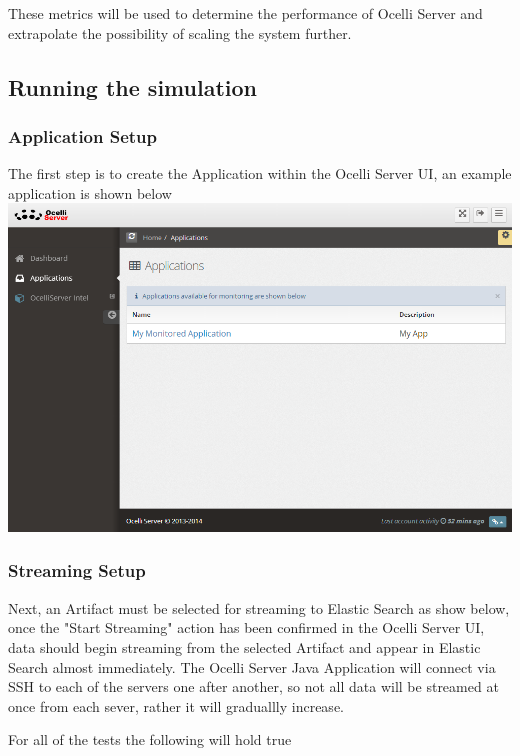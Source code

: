 \documentclass{llncs}
\begin{document}
These metrics will be used to determine the performance of Ocelli Server and extrapolate the possibility of scaling the system further.

\subsection{Running the simulation}

\subsubsection{Application Setup}
The first step is to create the Application within the Ocelli Server UI, an example application is shown below\newline\newline
\includegraphics[scale=0.5]{app1}\newline\newline
\subsubsection{Streaming Setup}
Next, an Artifact must be selected for streaming to Elastic Search as show below, once the "Start Streaming" action has been confirmed in the Ocelli Server UI, data should begin streaming from the selected Artifact and appear in Elastic Search almost immediately. The Ocelli Server Java Application will connect via SSH to each of the servers one after another, so not all data will be streamed at once from each sever, rather it will graduallly increase.\newline\newline

For all of the tests the following will hold true
\end{document}
